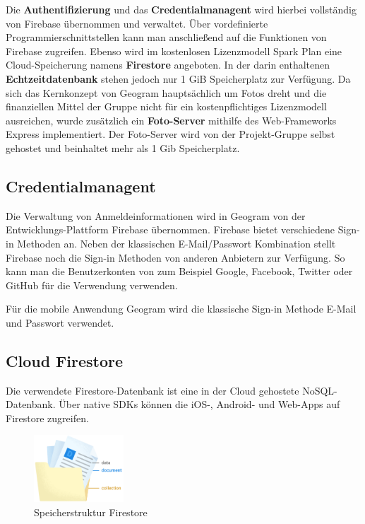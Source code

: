 Die \textbf{Authentifizierung} und das \textbf{Credentialmanagent} wird hierbei vollständig von Firebase übernommen und verwaltet. Über vordefinierte Programmierschnittstellen kann man anschließend auf die Funktionen von Firebase zugreifen. Ebenso wird im kostenlosen Lizenzmodell \glqq Spark Plan\grqq{} eine Cloud-Speicherung namens \glqq \textbf{Firestore}\grqq{} angeboten. In der darin enthaltenen \textbf{Echtzeitdatenbank} stehen jedoch nur 1 GiB Speicherplatz zur Verfügung. Da sich das Kernkonzept von Geogram hauptsächlich um Fotos dreht und die finanziellen Mittel der Gruppe nicht für ein kostenpflichtiges Lizenzmodell ausreichen, wurde zusätzlich ein \textbf{Foto-Server} mithilfe des Web-Frameworks \glqq Express\grqq{} implementiert. Der Foto-Server wird von der Projekt-Gruppe selbst gehostet und beinhaltet mehr als 1 Gib Speicherplatz.

\subsection{Credentialmanagent\label{sup3.2.1:Unterpunkt-1}}

Die Verwaltung von Anmeldeinformationen wird in Geogram von der Entwicklungs-Plattform Firebase übernommen. Firebase bietet verschiedene Sign-in Methoden an. Neben der klassischen E-Mail/Passwort Kombination stellt Firebase noch die Sign-in Methoden von anderen Anbietern zur Verfügung. So kann man die Benutzerkonten von zum Beispiel Google, Facebook, Twitter oder GitHub für die Verwendung verwenden.

Für die mobile Anwendung Geogram wird die klassische Sign-in Methode \glqq E-Mail und Passwort\grqq{} verwendet.

\subsection{Cloud Firestore\label{sup3.2.2:Unterpunkt-2}}

Die verwendete Firestore-Datenbank ist eine in der Cloud gehostete NoSQL-Datenbank. Über native SDKs können die iOS-, Android- und Web-Apps auf Firestore zugreifen.

\begin{figure}
    \begin{center}
        \includegraphics[width=0.3\textwidth]{images/firestore.png}
    \end{center}
    \caption{Speicherstruktur Firestore}
    \label{fig:storagestructure}
\end{figure}

